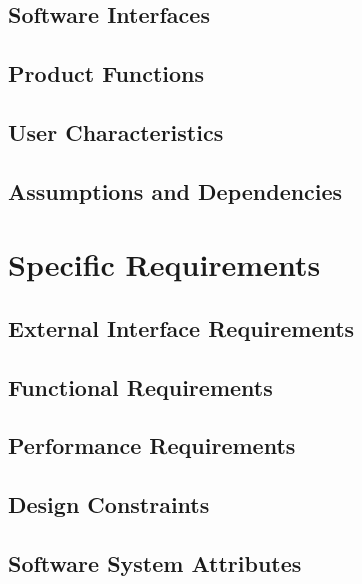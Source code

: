 \documentclass[12pt,a4paper]{article}
\begin{document}
   	\subsection{Software Interfaces}
   	\subsection{Product Functions}
	\subsection{User Characteristics}   	
   	\subsection{Assumptions and Dependencies}

   \section{Specific Requirements}
	\subsection{External Interface Requirements}
	
	\subsection{Functional Requirements}
		
	\subsection{Performance Requirements}
	
	\subsection{Design Constraints}
	
	\subsection{Software System Attributes}
   
\end{document}
